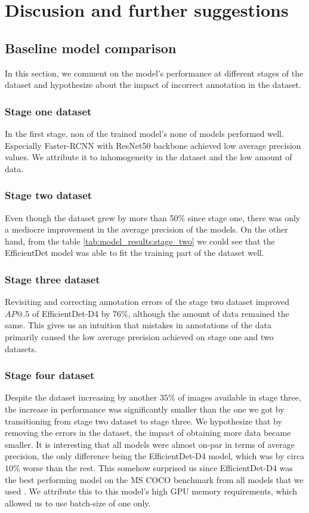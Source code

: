 \chapter{Discusion and further suggestions}

\section{Baseline model comparison}
In this section, we comment on the model's performance at different stages of the dataset and hypothesize about the impact of incorrect annotation in the dataset.
\subsection{Stage one dataset}
In the first stage, non of the trained model's none of models performed well. Especially Faster-RCNN with ResNet50 backbone achieved low average precision values. We attribute it to inhomogeneity in the dataset and the low amount of data.

\subsection{Stage two dataset}
Even though the dataset grew by more than 50\% since stage one, there was only a mediocre improvement in the average precision of the models. On the other hand, from the table \ref{tab:model_results:stage_two} we could see that the EfficientDet model was able to fit the training part of the dataset well.

\subsection{Stage three dataset}
Revisiting and correcting annotation errors of the stage two dataset improved $AP@.5$ of EfficientDet-D4 by $76\%$, although the amount of data remained the same. This gives us an intuition that mistakes in annotations of the data primarily caused the low average precision achieved on stage one and two datasets.

\subsection{Stage four dataset}
Despite the dataset increasing by another $35\%$ of images available in stage three, the increase in performance was significantly smaller than the one we got by transitioning from stage two dataset to stage three. We hypothesize that by removing the errors in the dataset, the impact of obtaining more data became smaller. It is interesting that all models were almost on-par in terms of average precision, the only difference being the EfficientDet-D4 model, which was by circa $10\%$ worse than the rest. This somehow surprised us since EfficientDet-D4 was the best performing model on the MS COCO benchmark from all models that we used \cite{paperwithcode}. We attribute this to this model's high GPU memory requirements, which allowed us to use batch-size of one only.


